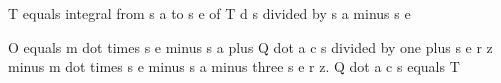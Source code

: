 T equals integral from s a to s e of T d s divided by s a minus s e

O equals m dot times s e minus s a plus Q dot a c s divided by one plus s e r z minus m dot times s e minus s a minus three s e r z. Q dot a c s equals T